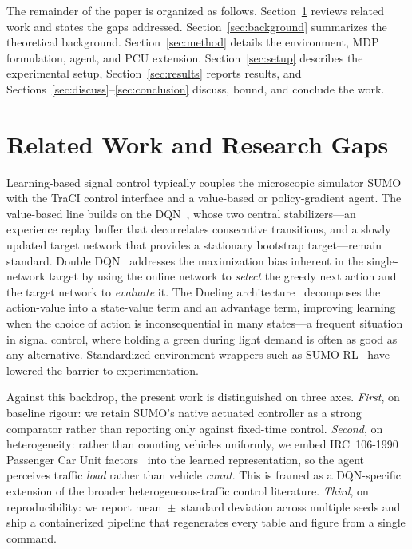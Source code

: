 \documentclass[conference]{IEEEtran}
\begin{document}
The remainder of the paper is organized as follows. Section~\ref{sec:related}
reviews related work and states the gaps addressed. Section~\ref{sec:background}
summarizes the theoretical background. Section~\ref{sec:method} details the
environment, MDP formulation, agent, and PCU extension. Section~\ref{sec:setup}
describes the experimental setup, Section~\ref{sec:results} reports results, and
Sections~\ref{sec:discuss}--\ref{sec:conclusion} discuss, bound, and conclude the
work.

\section{Related Work and Research Gaps}
\label{sec:related}
Learning-based signal control typically couples the microscopic simulator
SUMO~\cite{sumo2018} with the TraCI control interface and a value-based or
policy-gradient agent. The value-based line builds on the DQN~\cite{mnih2015},
whose two central stabilizers---an experience replay buffer that decorrelates
consecutive transitions, and a slowly updated target network that provides a
stationary bootstrap target---remain standard. Double DQN~\cite{vanhasselt2016}
addresses the maximization bias inherent in the single-network target by using
the online network to \emph{select} the greedy next action and the target
network to \emph{evaluate} it. The Dueling architecture~\cite{wang2016}
decomposes the action-value into a state-value term and an
advantage term, improving learning when the choice of action is
inconsequential in many states---a frequent situation in signal control, where
holding a green during light demand is often as good as any alternative.
Standardized environment wrappers such as SUMO-RL~\cite{sumorl} have lowered the
barrier to experimentation.

Against this backdrop, the present work is distinguished on three axes.
\emph{First}, on baseline rigour: we retain SUMO's native actuated controller as
a strong comparator rather than reporting only against fixed-time control.
\emph{Second}, on heterogeneity: rather than counting vehicles uniformly, we
embed IRC~106-1990 Passenger Car Unit factors~\cite{irc106} into the learned
representation, so the agent perceives traffic \emph{load} rather than vehicle
\emph{count}. This is framed as a DQN-specific extension of the broader
heterogeneous-traffic control literature. \emph{Third}, on reproducibility: we
report mean~$\pm$~standard deviation across multiple seeds and ship a
containerized pipeline that regenerates every table and figure from a single
command.
\end{document}
